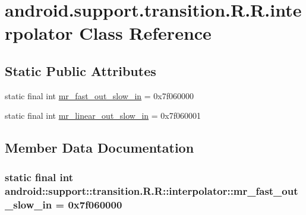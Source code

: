 \hypertarget{classandroid_1_1support_1_1transition_1_1_r_1_1interpolator}{
\section{android.support.transition.R.R.interpolator Class Reference}
\label{classandroid_1_1support_1_1transition_1_1_r_1_1interpolator}
}
\subsection*{Static Public Attributes}
\begin{CompactItemize}
\item 
static final int \hyperlink{classandroid_1_1support_1_1transition_1_1_r_1_1interpolator_0637898213c17fe93e38ba6d34c41332}{mr\_\-fast\_\-out\_\-slow\_\-in} = 0x7f060000
\item 
static final int \hyperlink{classandroid_1_1support_1_1transition_1_1_r_1_1interpolator_ed417eaedb02a0f0ab02d9a26f66e121}{mr\_\-linear\_\-out\_\-slow\_\-in} = 0x7f060001
\end{CompactItemize}


\subsection{Member Data Documentation}
\hypertarget{classandroid_1_1support_1_1transition_1_1_r_1_1interpolator_0637898213c17fe93e38ba6d34c41332}{
\subsubsection[{mr\_\-fast\_\-out\_\-slow\_\-in}]{\setlength{\rightskip}{0pt plus 5cm}static final int android::support::transition.R.R::interpolator::mr\_\-fast\_\-out\_\-slow\_\-in = 0x7f060000}}
\label{classandroid_1_1support_1_1transition_1_1_r_1_1interpolator_0637898213c17fe93e38ba6d34c41332}


